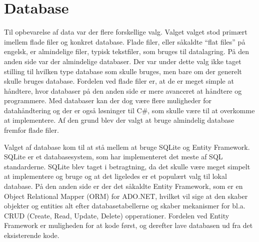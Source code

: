 \section{Database}
Til opbevarelse af data var der flere forskellige valg. Valget valget stod primært imellem flade filer og konkret database. Flade filer, eller såkaldte ``flat files'' på engelsk, er almindelige filer, typisk tekstfiler, som bruges til datalagring. På den anden side var der almindelige databaser. Der var under dette valg ikke taget stilling til hvilken type database som skulle bruges, men bare om der generelt skulle bruges database. 
Fordelen ved flade filer er, at de er meget simple at håndtere, hvor databaser på den anden side er mere avanceret at håndtere og programmere. Med databaser kan der dog være flere muligheder for datahåndtering og der er også løsninger til C#, som skulle være til at overkomme at implementere.\citep{flatfiles} Af den grund blev der valgt at bruge almindelig database fremfor flade filer. 

Valget af database kom til at stå mellem at bruge SQLite og Entity Framework. SQLite er et databasesystem, som har implementeret det meste af SQL standarderne. SQLite blev taget i betragtning, da det skulle være meget simpelt at implementere og bruge og at det ligeledes er et populært valg til lokal database. På den anden side er der det såkaldte Entity Framework, som er en Object Relational Mapper (ORM) for ADO.NET, hvilket vil sige at den skaber objekter og entities alt efter databasetabellerne og skaber mekanismer for bl.a. CRUD (Create, Read, Update, Delete) opperationer. \citep{entity} 
Fordelen ved Entity Framework er muligheden for at kode først, og derefter lave databasen ud fra det eksisterende kode. 





